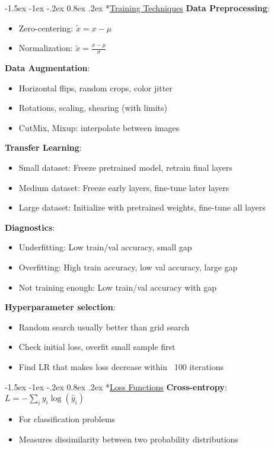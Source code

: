 \documentclass{article}
\makeatletter
\renewcommand\section{\@startsection{section}{1}{\z@}%
                                  {-1.5ex \@plus -1ex \@minus -.2ex}%
                                  {0.8ex \@plus.2ex}%
                                  {\normalfont\small\bfseries}}
\makeatother
\begin{document}
\begin{multicols}{3}
\section*{\underline{Training Techniques}}
\textbf{Data Preprocessing}:
\begin{itemize}
\item Zero-centering: $\tilde{x} = x - \mu$
\item Normalization: $\tilde{x} = \frac{x - \mu}{\sigma}$
\end{itemize}

\textbf{Data Augmentation}:
\begin{itemize}
\item Horizontal flips, random crops, color jitter
\item Rotations, scaling, shearing (with limits)
\item CutMix, Mixup: interpolate between images
\end{itemize}

\textbf{Transfer Learning}:
\begin{itemize}
\item Small dataset: Freeze pretrained model, retrain final layers
\item Medium dataset: Freeze early layers, fine-tune later layers
\item Large dataset: Initialize with pretrained weights, fine-tune all layers
\end{itemize}

\textbf{Diagnostics}:
\begin{itemize}
\item Underfitting: Low train/val accuracy, small gap
\item Overfitting: High train accuracy, low val accuracy, large gap
\item Not training enough: Low train/val accuracy with gap
\end{itemize}

\textbf{Hyperparameter selection}:
\begin{itemize}
\item Random search usually better than grid search
\item Check initial loss, overfit small sample first
\item Find LR that makes loss decrease within ~100 iterations
\end{itemize}

\section*{\underline{Loss Functions}}
\textbf{Cross-entropy}: $L = -\sum_i y_i \log(\hat{y}_i)$
\begin{itemize}
\item For classification problems
\item Measures dissimilarity between two probability distributions
\end{itemize}


\end{multicols}
\end{document}
